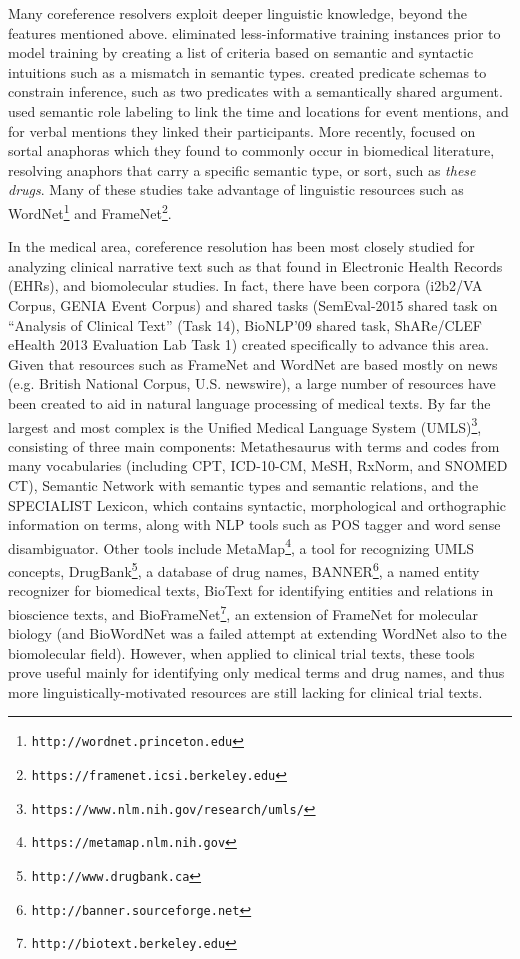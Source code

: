Many coreference resolvers exploit deeper linguistic knowledge, beyond the features mentioned above.  eliminated less-informative training instances prior to model training by creating a list of criteria based on semantic and syntactic intuitions such as a mismatch in semantic types.  created predicate schemas to constrain inference, such as two predicates with a semantically shared argument.  used semantic role labeling to link the time and locations for event mentions, and for verbal mentions they linked their participants. More recently,  focused on sortal anaphoras which they found to commonly occur in biomedical literature, resolving anaphors that carry a specific semantic type, or sort, such as \textit{these drugs}.  Many of these studies take advantage of linguistic resources such as WordNet\footnote{\tt http://wordnet.princeton.edu} and FrameNet\footnote{\tt https://framenet.icsi.berkeley.edu}.

In the medical area, coreference resolution has been most closely studied for analyzing clinical narrative text such as that found in Electronic Health Records (EHRs), and biomolecular studies. In fact, there have been corpora (i2b2/VA Corpus\cite{Uzuner:2012}, GENIA Event Corpus\cite{Kim:2008}) and shared tasks (SemEval-2015 shared task on “Analysis of Clinical Text” (Task 14)\cite{Elhadad:2015}, BioNLP’09 shared task\cite{Kim:2009}, ShARe/CLEF eHealth 2013 Evaluation Lab Task 1\cite{Pradhan:2013}) created specifically to advance this area. Given that resources such as FrameNet and WordNet are based mostly on news (e.g. British National Corpus, U.S. newswire), a large number of resources have been created to aid in natural language processing of medical texts. By far the largest and most complex is the Unified Medical Language System (UMLS)\footnote{\tt https://www.nlm.nih.gov/research/umls/}, consisting of three main components:  Metathesaurus with terms and codes from many vocabularies (including CPT, ICD-10-CM, MeSH, RxNorm, and SNOMED CT), Semantic Network with semantic types and semantic relations, and the SPECIALIST Lexicon, which contains syntactic, morphological and orthographic information on terms, along with NLP tools such as POS tagger and word sense disambiguator. Other tools include MetaMap\footnote{\tt https://metamap.nlm.nih.gov}, a tool for recognizing UMLS concepts, DrugBank\footnote{\tt http://www.drugbank.ca}, a database of drug names, BANNER\footnote{\tt http://banner.sourceforge.net}, a named entity recognizer for biomedical texts, BioText for identifying entities and relations in bioscience texts, and BioFrameNet\footnote{\tt http://biotext.berkeley.edu}, an extension of FrameNet for molecular biology (and BioWordNet\cite{Poprat:2008} was a failed attempt at extending WordNet also to the biomolecular field). However, when applied to clinical trial texts, these tools prove useful mainly for identifying only medical terms and drug names, and thus more linguistically-motivated resources are still lacking for clinical trial texts.

